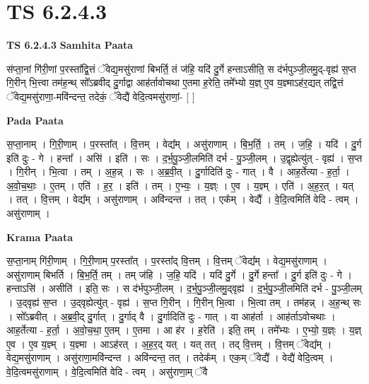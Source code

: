 \documentclass[17pt]{extarticle}
\begin{document}
\section{ TS 6.2.4.3 }

\textbf{TS 6.2.4.3 } \newline
\textbf{Samhita Paata} \newline

स॑प्ता॒नां गि॑री॒णां प॒रस्ता᳚द्वि॒त्तं ॅवेद्य॒मसु॑राणां बिभर्ति॒ तं ज॑हि॒ यदि॑ दु॒र्गे हन्ताऽसीति॒ स द॑र्भपुञ्जी॒लमु॒द्-वृह्य॑ स॒प्त गि॒रीन् भि॒त्त्वा तम॑ह॒न्थ् सो᳚ऽब्रवीद् दु॒र्गाद्वा आह॑र्तावोचथा ए॒तमा ह॒रेति॒ तमे᳚भ्यो य॒ज्ञ् ए॒व य॒ज्ञ्माऽह॑र॒द्यत् तद्वि॒त्तं ॅवेद्य॒मसु॑राणा॒-मवि॑न्दन्त॒ तदेकं॒ ॅवेद्यै॑ वेदि॒त्वमसु॑राणां॒- [  ] \newline

\textbf{Pada Paata} \newline

स॒प्ता॒नाम् । गि॒री॒णाम् । प॒रस्ता᳚त् । वि॒त्तम् । वेद्य᳚म् । असु॑राणाम् । बि॒भ॒र्ति॒ । तम् । ज॒हि॒ । यदि॑ । दु॒र्ग इति॑ दुः - गे । हन्ता᳚ । असि॑ । इति॑ । सः । द॒र्भ॒पु॒ञ्जी॒लमिति॑ दर्भ - पु॒ञ्जी॒लम् । उ॒द्वृह्येत्यु॑त् - वृह्य॑ । स॒प्त । गि॒रीन् । भि॒त्वा । तम् । अ॒ह॒न्न् । सः । अ॒ब्र॒वी॒त् । दु॒र्गादिति॑ दुः - गात् । वै । आह॒र्तेत्या - ह॒र्ता॒ । अ॒वो॒च॒थाः॒ । ए॒तम् । एति॑ । ह॒र॒ । इति॑ । तम् । ए॒भ्यः॒ । य॒ज्ञ्ः । ए॒व । य॒ज्ञ्म् । एति॑ । अ॒ह॒र॒त् । यत् । तत् । वि॒त्तम् । वेद्य᳚म् । असु॑राणाम् । अवि॑न्दन्त । तत् । एक᳚म् । वेद्यै᳚ । वे॒दि॒त्वमिति॑ वेदि - त्वम् । असु॑राणाम् ।  \newline


\textbf{Krama Paata} \newline

स॒प्ता॒नाम् गि॑री॒णाम् । गि॒री॒णाम् प॒रस्ता᳚त् । प॒रस्ता᳚द् वि॒त्तम् । वि॒त्तम् ॅवेद्य᳚म् । वेद्य॒मसु॑राणाम् । असु॑राणाम् बिभर्ति । बि॒भ॒र्ति॒ तम् । तम् ज॑हि । ज॒हि॒ यदि॑ । यदि॑ दु॒र्गे । दु॒र्गे हन्ता᳚ । दु॒र्ग इति॑ दुः - गे । हन्ताऽसि॑ । असीति॑ । इति॒ सः । स द॑र्भपुञ्जी॒लम् । द॒र्भ॒पु॒ञ्जी॒लमु॒द्‍वृह्य॑ । द॒र्भ॒पु॒ञ्जी॒लमिति॑ दर्भ - पु॒ञ्जी॒लम् । उ॒द्‍वृह्य॑ स॒प्त । उ॒द्‍वृह्येत्यु॑त् - वृह्य॑ । स॒प्त गि॒रीन् । गि॒रीन् भि॒त्वा । भि॒त्वा तम् । तम॑हन्न् । अ॒ह॒न्थ् सः । सो᳚ऽब्रवीत् । अ॒ब्र॒वी॒द् दु॒र्गात् । दु॒र्गाद् वै । दु॒र्गादिति॑ दुः - गात् । वा आह॑र्ता । आह॑र्ताऽवोचथाः । आह॒र्तेत्या - ह॒र्ता॒ । अ॒वो॒च॒था॒ ए॒तम् । ए॒तमा । आ ह॑र । ह॒रेति॑ । इति॒ तम् । तमे᳚भ्यः । ए॒भ्यो॒ य॒ज्ञ्ः । य॒ज्ञ् ए॒व । ए॒व य॒ज्ञ्म् । य॒ज्ञ्मा । आऽह॑रत् । अ॒ह॒र॒द् यत् । यत् तत् । तद् वि॒त्तम् । वि॒त्तम् ॅवेद्य᳚म् । वेद्य॒मसु॑राणाम् । असु॑राणा॒मवि॑न्दन्त । अवि॑न्दन्त॒ तत् । तदेक᳚म् । एक॒म् ॅवेद्यै᳚ । वेद्यै॑ वेदि॒त्वम् । वे॒दि॒त्वमसु॑राणाम् । वे॒दि॒त्वमिति॑ वेदि - त्वम् । असु॑राणा॒म् ॅवै \newline
\end{document}
